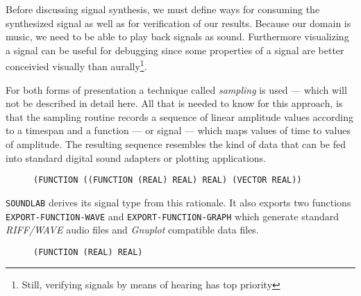 Before discussing signal synthesis, we must define ways for consuming the
synthesized signal as well as for verification of our results. Because
our domain is music, we need to be able to play back signals as sound.
Furthermore visualizing a signal can be useful for debugging since some
properties of a signal are better conceivied visually than
aurally\footnote{Still, verifying signals by means of hearing has top
priority}.

For both forms of presentation a technique called \textit{sampling} is
used --- which will not be described in detail here. All that is needed
to know for this approach, is that the sampling routine records a
sequence of linear amplitude values according to a timespan and a
function --- or signal --- which maps values of time to values of
amplitude. The resulting sequence resembles the kind of data that can be
fed into standard digital sound adapters or plotting applications.

\begin{figure}
\centering
\texttt{(FUNCTION ((FUNCTION (REAL) REAL) REAL) (VECTOR REAL))}
\end{figure}

\texttt{SOUNDLAB} derives its signal type from this rationale. It also
exports two functions \texttt{EXPORT-FUNCTION-WAVE} and
\texttt{EXPORT-FUNCTION-GRAPH} which generate standard \textit{RIFF/WAVE}
audio files and \textit{Gnuplot} compatible data files.

\begin{figure}
\centering
\texttt{(FUNCTION (REAL) REAL)}
\end{figure}
